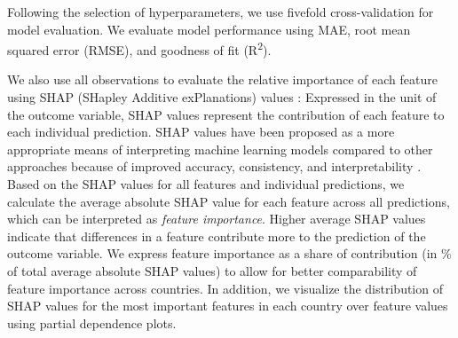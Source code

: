 \documentclass[12pt, a4paper]{article}
\begin{document}
Following the selection of hyperparameters, we use fivefold cross-validation for model evaluation. We evaluate model performance using MAE, root mean squared error (RMSE), and goodness of fit (R\textsuperscript{2}). 

We also use all observations to evaluate the relative importance of each feature using SHAP (SHapley Additive exPlanations) values \autocite{Lundberg.2017}: Expressed in the unit of the outcome variable, SHAP values represent the contribution of each feature to each individual prediction. SHAP values have been proposed as a more appropriate means of interpreting machine learning models compared to other approaches because of improved accuracy, consistency, and interpretability \autocite{Lundberg.2020}. Based on the SHAP values for all features and individual predictions, we calculate the average absolute SHAP value for each feature across all predictions, which can be interpreted as \textit{feature importance}. Higher average SHAP values indicate that differences in a feature contribute more to the prediction of the outcome variable. We express feature importance as a share of contribution (in \% of total average absolute SHAP values) to allow for better comparability of feature importance across countries. In addition, we visualize the distribution of SHAP values for the most important features in each country over feature values using partial dependence plots. 



\end{document}
